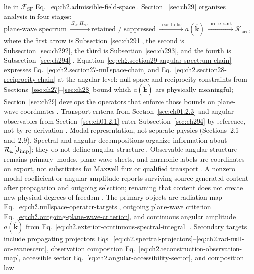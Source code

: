 lie in \(\mathcal{F}_{\mathrm{SF}}\) Eq.~\eqref{eq:ch2.admissible-field-space}. Section
~\ref{sec:ch29} organizes analysis in four stages:
\begin{equation}
\label{eq:ch2.section29-angular-spectrum-chain}
\text{plane-wave spectrum}
\ \xrightarrow{\ \mathcal{R}_\omega,\Pi_{\mathrm{rad}}\ }
\text{retained / suppressed}
\ \xrightarrow{\ \text{near-to-far}\ }
a(\widehat{\mathbf{k}})
\ \xrightarrow{\ \text{probe rank}\ }
\mathcal{K}_{\mathrm{acc}},
\end{equation}
where the first arrow is Subsection~\ref{sec:ch291}, the second is Subsection~\ref{sec:ch292},
the third is Subsection~\ref{sec:ch293}, and the fourth is Subsection~\ref{sec:ch294}
\cite{stratton1941}. Equation~\eqref{eq:ch2.section29-angular-spectrum-chain}
expresses Eq.~\eqref{eq:ch2.section27-nullspace-chain} and
Eq.~\eqref{eq:ch2.section28-reciprocity-chain} at the angular level: null-space and reciprocity
constraints from Sections~\ref{sec:ch27}--\ref{sec:ch28} bound which \(a(\widehat{\mathbf{k}})\)
are physically meaningful; Section~\ref{sec:ch29} develops the operators that enforce those
bounds on plane-wave coordinates \cite{stratton1941}. Transport criteria from
Section~\ref{sec:ch01.2.3} and angular observables from Section~\ref{sec:ch01.2.1} enter
Subsection~\ref{sec:ch294} by reference, not by re-derivation \cite{stratton1941}.
Modal representation, not separate physics (Sections~2.6 and~2.9). Spectral and angular decompositions organize information about \(\mathcal{R}_\omega[\mathbf{J}_{\mathrm{imp}}]\);
they do not define angular structure \cite{stratton1941}. Observable angular structure remains
primary: modes, plane-wave sheets, and harmonic labels are coordinates on export, not substitutes
for Maxwell flux or qualified transport \cite{maxwell1873}. A nonzero modal coefficient or
angular amplitude reports surviving source-generated content after propagation and outgoing
selection; renaming that content does not create new physical degrees of freedom
\cite{harrington2001}.
The primary objects are radiation map
Eq.~\eqref{eq:ch2.nullspace-operator-targets}, outgoing plane-wave criterion
Eq.~\eqref{eq:ch2.outgoing-plane-wave-criterion}, and continuous angular amplitude
\(a(\widehat{\mathbf{k}})\) from Eq.~\eqref{eq:ch2.exterior-continuous-spectral-integral}
\cite{stratton1941}. Secondary targets include propagating projectors
Eqs.~\eqref{eq:ch2.spectral-projectors}--\eqref{eq:ch2.rad-null-on-evanescent},
observation composition Eq.~\eqref{eq:ch2.reconstruction-observation-map}, accessible sector
Eq.~\eqref{eq:ch2.angular-accessibility-sector}, and composition law
